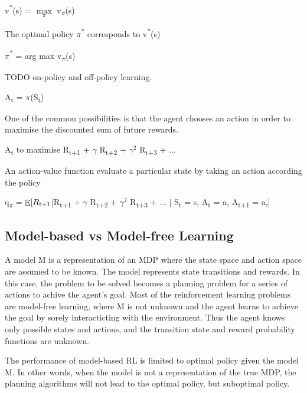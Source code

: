 \documentclass[12pt,twoside]{report}
\DeclareMathOperator{\E}{\mathbb{E}}
\begin{document}
v\textsuperscript{*}(s) = $\underset{\pi}{\max}$ v\textsubscript{$\pi$}(s) 

The optimal policy $\pi$\textsuperscript{*} corresponds to v\textsuperscript{*}(s)

$\pi$\textsuperscript{*} = arg max v\textsubscript{$\pi$}(s)


TODO on-policy and off-policy learning.

A\textsubscript{t} = $\pi$(S\textsubscript{t})

One of the common possibilities is that the agent chooses an action in order to maximise the discounted sum of future rewards.

A\textsubscript{t} to maximise R\textsubscript{t+1} + $\gamma$ R\textsubscript{t+2} + $\gamma^2$ R\textsubscript{t+3} + ...

An action-value function evaluate a particular state by taking an action according the policy

q\textsubscript{$\pi$} = $\displaystyle \E[R\textsubscript{t+1} $[R\textsubscript{t+1} + $\gamma$ R\textsubscript{t+2} + $\gamma^2$ R\textsubscript{t+3} + ... $\vert$ S\textsubscript{t} = s, A\textsubscript{t} = a, A\textsubscript{t+1 } = a,]

\subsection{Model-based vs Model-free Learning}

A model M is a representation of an MDP where the state space and action space are assumed to be known. The model represents state transitions and rewards. In this case, the problem to be solved becomes a planning problem for a series of actions to achive the agent's goal.
Most of the reinforcement learning problems are model-free learning, where M is not unknown and the agent learns to achieve the goal by sorely interacticting with the environment. Thus the agent knows only possible states and actions, and the transition state and reward probability functions are unknown.

The performance of model-based RL is limited to optimal policy given the model M. In other words, when the model is not a representation of the true MDP, the planning algorithms will not lead to the optimal policy, but suboptimal policy. 
\end{document}
